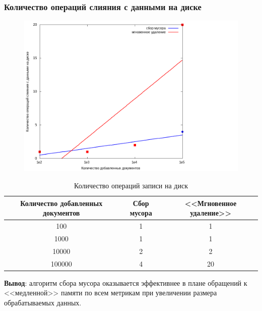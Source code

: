 \subsubsection{Количество операций слияния с данными на диске}

\begin{figure}[H]
\centering
\includegraphics[width=\linewidth]{fig/merges.png}
\end{figure}

\begin{table}[H]
      \caption{Количество операций записи на диск}
      \centering
      \small
      \singlespacing
      \begin{tabular}{|c|c|c|}
            \hline
            Количество добавленных документов   & Сбор мусора                 & <<Мгновенное удаление>>     \\ \hline \hline
            100                                 & 1                           & 1                           \\ \hline
            1000                                & 1                           & 1                           \\ \hline
            10000                               & 2                           & 2                           \\ \hline
            100000                              & 4                           & 20                          \\ \hline
\end{tabular}
\end{table}

\textbf{Вывод}: алгоритм сбора мусора оказывается эффективнее в плане
обращений к <<медленной>> памяти по всем метрикам при увеличении размера 
обрабатываемых данных.
